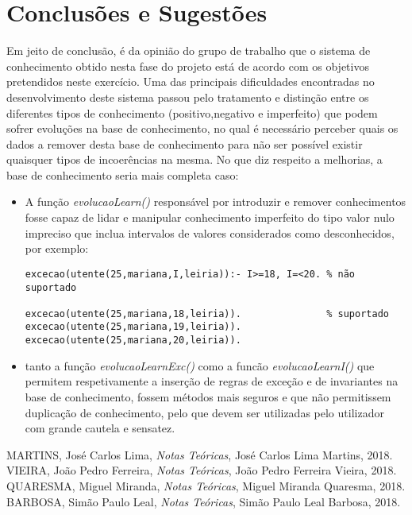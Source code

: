 \documentclass{article}
\begin{document}
\newpage

\vspace*{\fill}
\section{Conclusões e Sugestões}
Em jeito de conclusão, é da opinião do grupo de trabalho que o sistema de conhecimento obtido nesta fase do projeto está de acordo com os objetivos pretendidos neste exercício. Uma das principais dificuldades encontradas no desenvolvimento deste sistema passou pelo tratamento e distinção entre os diferentes tipos de conhecimento (positivo,negativo e imperfeito) que podem sofrer evoluções na base de conhecimento, no qual é necessário perceber quais os dados a remover desta base de conhecimento para não ser possível existir quaisquer tipos de incoerências na mesma.
No que diz respeito a melhorias, a base de conhecimento seria mais completa caso:
\begin{itemize}
	\item	A função \textit{evolucaoLearn()} responsável por introduzir e remover conhecimentos fosse capaz de lidar e manipular conhecimento imperfeito do tipo valor nulo impreciso que inclua intervalos de valores considerados como desconhecidos, por exemplo:
\begin{verbatim}
excecao(utente(25,mariana,I,leiria)):- I>=18, I=<20. % não suportado

excecao(utente(25,mariana,18,leiria)).               % suportado
excecao(utente(25,mariana,19,leiria)).
excecao(utente(25,mariana,20,leiria)).
\end{verbatim}
	\item tanto a função \textit{evolucaoLearnExc()} como a funcão \textit{evolucaoLearnI()} que permitem respetivamente a inserção de regras de exceção e de invariantes na base de conhecimento, fossem métodos mais seguros e que não permitissem duplicação de conhecimento, pelo que devem ser utilizadas pelo utilizador com grande cautela e sensatez.
\end{itemize}
\vspace*{\fill}

\newpage

\begin{thebibliography}{10}
    MARTINS, José Carlos Lima,
    \textit{Notas Teóricas},
    José Carlos Lima Martins, 
    2018.
    VIEIRA, João Pedro Ferreira,
    \textit{Notas Teóricas},
    João Pedro Ferreira Vieira, 
    2018.
    QUARESMA, Miguel Miranda,
    \textit{Notas Teóricas},
    Miguel Miranda Quaresma, 
    2018.
    BARBOSA, Simão Paulo Leal,
    \textit{Notas Teóricas},
    Simão Paulo Leal Barbosa, 
    2018. 
\end{thebibliography}
\end{document}
